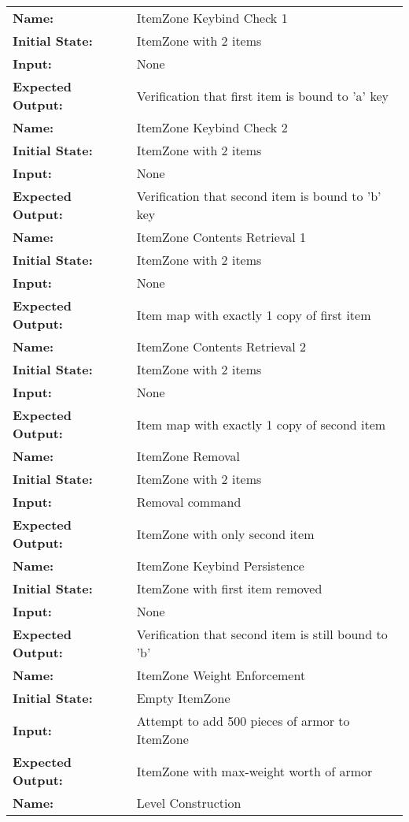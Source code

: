 \documentclass[12pt, titlepage]{article}
\begin{document}
\begin{center}
\begin{longtable}{ l | l }
\hline
\textbf{Name:} & ItemZone Keybind Check 1\\
\textbf{Initial State:} & ItemZone with 2 items\\
\textbf{Input:} & None\\
\textbf{Expected Output:} & Verification that first item is bound to 'a' key\\
\hline
\textbf{Name:} & ItemZone Keybind Check 2\\
\textbf{Initial State:} & ItemZone with 2 items\\
\textbf{Input:} & None\\
\textbf{Expected Output:} & Verification that second item is bound to 'b' key\\
\hline
\textbf{Name:} & ItemZone Contents Retrieval 1\\
\textbf{Initial State:} & ItemZone with 2 items\\
\textbf{Input:} & None\\
\textbf{Expected Output:} & Item map with exactly 1 copy of first item\\
\hline
\textbf{Name:} & ItemZone Contents Retrieval 2\\
\textbf{Initial State:} & ItemZone with 2 items\\
\textbf{Input:} & None\\
\textbf{Expected Output:} & Item map with exactly 1 copy of second item\\
\hline
\textbf{Name:} & ItemZone Removal\\
\textbf{Initial State:} & ItemZone with 2 items\\
\textbf{Input:} & Removal command\\
\textbf{Expected Output:} & ItemZone with only second item\\
\hline
\textbf{Name:} & ItemZone Keybind Persistence\\
\textbf{Initial State:} & ItemZone with first item removed\\
\textbf{Input:} & None\\
\textbf{Expected Output:} & Verification that second item is still bound to 'b'\\
\hline
\textbf{Name:} & ItemZone Weight Enforcement\\
\textbf{Initial State:} & Empty ItemZone\\
\textbf{Input:} & Attempt to add 500 pieces of armor to ItemZone\\
\textbf{Expected Output:} & ItemZone with max-weight worth of armor\\
\hline
\textbf{Name:} & Level Construction\\

\end{longtable}
\end{center}
\end{document}
